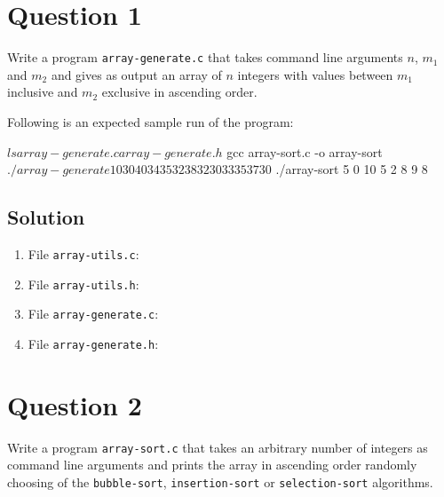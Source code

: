 \documentclass[12pt,letterpaper,twoside]{article}
\begin{document}


\section*{Question 1}

Write a program \texttt{array-generate.c} that takes command line arguments $n$, $m_1$ and $m_2$ and gives as output an array of $n$ integers with values between $m_1$ inclusive and $m_2$ exclusive in ascending order.

Following is an expected sample run of the program:

\begin{terminal}
$ ls
array-generate.c array-generate.h
$ gcc array-sort.c -o array-sort
$ ./array-generate 10 30 40
34 35 32 38 32 30 33 35 37 30
$ ./array-sort 5 0 10
5 2 8 9 8
\end{terminal}

\subsection*{Solution}

\lstset{language=c,tabsize=4}
\begin{enumerate}
\item File \texttt{array-utils.c}:

\item File \texttt{array-utils.h}:

\item File \texttt{array-generate.c}:

\item File \texttt{array-generate.h}:

\end{enumerate}

\section*{Question 2}

Write a program \texttt{array-sort.c} that takes an arbitrary number of integers as command line arguments and prints the array in ascending order randomly choosing of the \texttt{bubble-sort}, \texttt{insertion-sort} or \texttt{selection-sort} algorithms.
\end{document}
